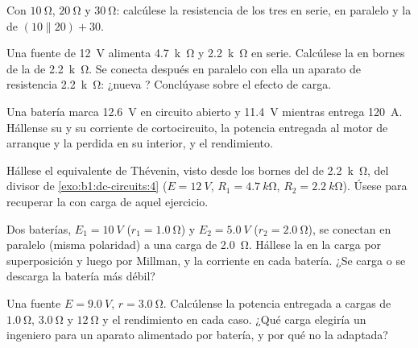 \begin{exercise}[$\star$]\label{exo:b1:dc-circuits:3}
Con $\qty{10}{\ohm}$, $\qty{20}{\ohm}$ y $\qty{30}{\ohm}$: calcúlese la
resistencia de los tres en serie, en paralelo y la de
$(10 \parallel 20) + 30$.
\end{exercise}

\begin{exercise}[$\star$]\label{exo:b1:dc-circuits:4}
Una fuente de \qty{12}{V} alimenta \qty{4.7}{k\ohm} y \qty{2.2}{k\ohm} en
serie. Calcúlese la  en bornes de la de \qty{2.2}{k\ohm}. Se
conecta después en paralelo con ella un aparato de resistencia
\qty{2.2}{k\ohm}: ¿nueva ? Conclúyase sobre el efecto de carga.
\end{exercise}

\begin{exercise}[$\star\star$]\label{exo:b1:dc-circuits:5}
Una batería marca \qty{12.6}{V} en circuito abierto y \qty{11.4}{V}
mientras entrega \qty{120}{A}. Hállense su  y su
corriente de cortocircuito, la potencia entregada al motor de arranque y
la perdida en su interior, y el rendimiento.
\end{exercise}

\begin{exercise}[$\star\star$]\label{exo:b1:dc-circuits:6}
Hállese el equivalente de Thévenin, visto desde los bornes del  de
\qty{2.2}{k\ohm}, del divisor de \cref{exo:b1:dc-circuits:4}
($E = \qty{12}{V}$, $R_1 = \qty{4.7}{k\ohm}$, $R_2 = \qty{2.2}{k\ohm}$).
Úsese para recuperar la  con carga de aquel ejercicio.
\end{exercise}

\begin{exercise}[$\star\star$]\label{exo:b1:dc-circuits:7}
Dos baterías, $E_1 = \qty{10}{V}$ ($r_1 = \qty{1.0}{\ohm}$) y
$E_2 = \qty{5.0}{V}$ ($r_2 = \qty{2.0}{\ohm}$), se conectan en paralelo
(misma polaridad) a una carga de \qty{2.0}{\ohm}. Hállese la  en la
carga por superposición y luego por Millman, y la corriente en cada
batería. ¿Se carga o se descarga la batería más débil?
\end{exercise}

\begin{exercise}[$\star\star$]\label{exo:b1:dc-circuits:8}
Una fuente $E = \qty{9.0}{V}$, $r = \qty{3.0}{\ohm}$. Calcúlense la
potencia entregada a cargas de $\qty{1.0}{\ohm}$, $\qty{3.0}{\ohm}$ y $\qty{12}{\ohm}$
y el rendimiento en cada caso. ¿Qué carga elegiría un ingeniero para un
aparato alimentado por batería, y por qué no la adaptada?
\end{exercise}

